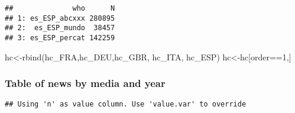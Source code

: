 \documentclass[
]{article}
\newenvironment{Shaded}{\begin{snugshade}}{\end{snugshade}}
\newcommand{\AttributeTok}[1]{\textcolor[rgb]{0.77,0.63,0.00}{#1}}
\newcommand{\DecValTok}[1]{\textcolor[rgb]{0.00,0.00,0.81}{#1}}
\newcommand{\FunctionTok}[1]{\textcolor[rgb]{0.00,0.00,0.00}{#1}}
\newcommand{\NormalTok}[1]{#1}
\newcommand{\OtherTok}[1]{\textcolor[rgb]{0.56,0.35,0.01}{#1}}
\newcommand{\SpecialCharTok}[1]{\textcolor[rgb]{0.00,0.00,0.00}{#1}}
\begin{document}
\begin{verbatim}
##              who      N
## 1: es_ESP_abcxxx 280895
## 2:  es_ESP_mundo  38457
## 3: es_ESP_percat 142259
\end{verbatim}

\begin{Shaded}
\begin{Highlighting}[]
\NormalTok{hc}\OtherTok{\textless{}{-}}\FunctionTok{rbind}\NormalTok{(hc\_FRA,hc\_DEU,hc\_GBR, hc\_ITA, hc\_ESP)}
\NormalTok{hc}\OtherTok{\textless{}{-}}\NormalTok{hc[order}\SpecialCharTok{==}\DecValTok{1}\NormalTok{,]}
\end{Highlighting}
\end{Shaded}

\hypertarget{table-of-news-by-media-and-year}{%
\subsubsection{Table of news by media and
year}\label{table-of-news-by-media-and-year}}

\begin{Shaded}
\end{Shaded}

\begin{verbatim}
## Using 'n' as value column. Use 'value.var' to override
\end{verbatim}

\begin{Shaded}
\end{Shaded}
\end{document}
